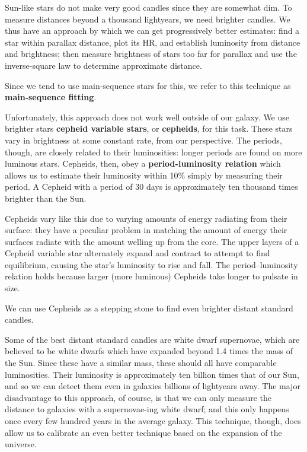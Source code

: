 \documentclass[12pt]{article}
\begin{document}
Sun-like stars do not make very good candles since they are somewhat dim. To measure distances beyond a thousand lightyears, we need brighter candles. We thus have an approach by which we can get progressively better estimates: find a star within parallax distance, plot its HR, and establish luminosity from distance and brightness; then measure brightness of stars too far for parallax and use the inverse-square law to determine approximate distance.

Since we tend to use main-sequence stars for this, we refer to this technique as {\bf main-sequence fitting}.

Unfortunately, this approach does not work well outside of our galaxy. We use brighter stars {\bf cepheid variable stars}, or {\bf cepheids}, for this task. These stars vary in brightness at some constant rate, from our perspective. The periods, though, are closely related to their luminosities: longer periods are found on more luminous stars. Cepheids, then, obey a {\bf period-luminosity relation} which allows us to estimate their luminosity within 10\% simply by measuring their period. A Cepheid with a period of 30 days is approximately ten thousand times brighter than the Sun.

Cepheids vary like this due to varying amounts of energy radiating from their surface: they have a peculiar problem in matching the amount of energy their surfaces radiate with the amount welling up from the core. The upper layers of a Cepheid variable star alternately expand and contract to attempt to find equilibrium, causing the star’s luminosity to rise and fall. The period–luminosity relation holds because larger (more luminous) Cepheids take longer to pulsate in size.

We can use Cepheids as a stepping stone to find even brighter distant standard candles.

Some of the best distant standard candles are white dwarf supernovae, which are believed to be white dwarfs which have expanded beyond 1.4 times the mass of the Sun. Since these have a similar mass, these should all have comparable luminosities. Their luminosity is approximately ten billion times that of our Sun, and so we can detect them even in galaxies billions of lightyears away. The major disadvantage to this approach, of course, is that we can only measure the distance to galaxies with a supernovae-ing white dwarf; and this only happens once every few hundred years in the average galaxy. This technique, though, does allow us to calibrate an even better technique based on the expansion of the universe.
\end{document}
